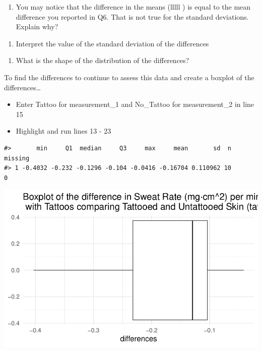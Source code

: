 \documentclass[
]{report}
\providecommand{\tightlist}{%
  \setlength{\itemsep}{0pt}\setlength{\parskip}{0pt}}
\begin{document}
\vspace{0.2in}

\begin{enumerate}
\def\labelenumi{\arabic{enumi}.}
\setcounter{enumi}{7}
\tightlist
\item
  You may notice that the difference in the means (lllll ) is equal to the mean difference you reported in Q6. That is not true for the standard deviations. Explain why?
\end{enumerate}

\vspace{0.8in}

\begin{enumerate}
\def\labelenumi{\arabic{enumi}.}
\setcounter{enumi}{8}
\tightlist
\item
  Interpret the value of the standard deviation of the differences
\end{enumerate}

\vspace{0.6in}

\begin{enumerate}
\def\labelenumi{\arabic{enumi}.}
\setcounter{enumi}{9}
\tightlist
\item
  What is the shape of the distribution of the differences?
\end{enumerate}

\vspace{0.3in}

To find the differences to continue to assess this data and create a boxplot of the differences\ldots{}

\begin{itemize}
\item
  Enter Tattoo for measurement\_1 and No\_Tattoo for measurement\_2 in line 15
\item
  Highlight and run lines 13 - 23
\end{itemize}

\begin{verbatim}
#>       min     Q1  median     Q3     max     mean       sd  n missing
#> 1 -0.4032 -0.232 -0.1296 -0.104 -0.0416 -0.16704 0.110962 10       0
\end{verbatim}

\begin{center}\includegraphics[width=0.7\linewidth]{11-A21-EDA-paired_files/figure-latex/unnamed-chunk-2-1} \end{center}
\end{document}
